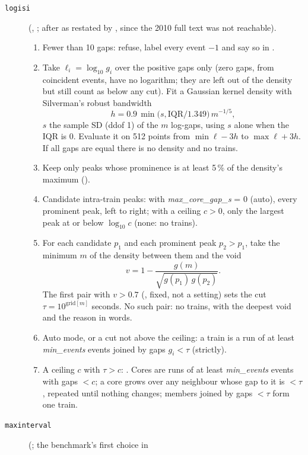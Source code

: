 \begin{description}
\item[\texttt{logisi}] (, ; after
  \citet{pasquale2010selfadapting} as restated by \citet{cotterill2016comparison}, since the
  2010 full text was not reachable).
  \begin{enumerate}
  \item Fewer than 10 gaps: refuse, label every event $-1$ and say so in .
  \item Take $\ell_i = \log_{10} g_i$ over the positive gaps only (zero gaps, from
    coincident events, have no logarithm; they are left out of the density but still count
    as below any cut). Fit a Gaussian kernel density with Silverman's robust bandwidth
    \[ h = 0.9\,\min\!\bigl(s, \mathrm{IQR}/1.349\bigr)\, m^{-1/5}, \]
    $s$ the sample SD (ddof 1) of the $m$ log-gaps, using $s$ alone when the IQR is 0.
    Evaluate it on 512 points from $\min\ell - 3h$ to $\max\ell + 3h$. If all gaps are
    equal there is no density and no trains.
  \item Keep only peaks whose prominence is at least 5\,\% of the density's maximum
    ().
  \item Candidate intra-train peaks: with \emph{max\_core\_gap\_s} = 0 (auto), every
    prominent peak, left to right; with a ceiling $c > 0$, only the largest peak at or
    below $\log_{10} c$ (none: no trains).
  \item For each candidate $p_1$ and each prominent peak $p_2 > p_1$, take the minimum $m$ of
    the density between them and the void
    \[ v = 1 - \frac{g(m)}{\sqrt{g(p_1)\,g(p_2)}} . \]
    The first pair with $v > 0.7$ (, fixed, not a setting) sets the
    cut $\tau = 10^{\text{grid}[m]}$ seconds. No such pair: no trains, with the deepest void
    and the reason in words.
  \item Auto mode, or a cut not above the ceiling: a train is a run of at least
    \emph{min\_events} events joined by gaps $g_i < \tau$ (strictly).
  \item A ceiling $c$ with $\tau > c$: . Cores are runs of at least
    \emph{min\_events} events with gaps $< c$; a core grows over any neighbour whose gap to
    it is $< \tau$, repeated until nothing changes; members joined by gaps $< \tau$ form one
    train.
  \end{enumerate}
\item[\texttt{maxinterval}] (; the benchmark's first choice in

\end{description}
